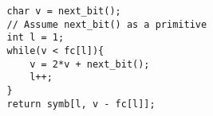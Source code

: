 \documentclass{subfiles}
\begin{document}
    \begin{figure*}[!hb]
        \centering
        \begin{subfigure}{0.35\textwidth}
            \centering
            \begin{lstlisting}
                char v = next_bit(); 
                // Assume next_bit() as a primitive
                int l = 1;
                while(v < fc[l]){
                    v = 2*v + next_bit();
                    l++;
                }
                return symb[l, v - fc[l]];
            \end{lstlisting}
        \end{subfigure}
    \end{figure*}
\end{document}
